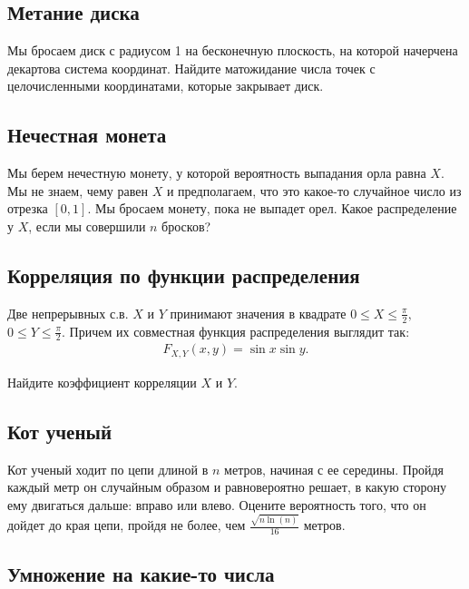 \documentclass[12pt]{article}
\begin{document}
\subsection{Метание диска}

Мы бросаем диск с радиусом 1 на бесконечную плоскость, на которой начерчена декартова система координат. Найдите матожидание числа точек с целочисленными координатами, которые закрывает диск.



\subsection{Нечестная монета}

Мы берем нечестную монету, у которой вероятность выпадания орла равна $X$. Мы не знаем, чему равен $X$ и предполагаем, что это какое-то случайное число из отрезка $[0, 1]$. Мы бросаем монету, пока не выпадет орел. Какое распределение у $X$, если мы совершили $n$ бросков?



\subsection{Корреляция по функции распределения}

Две непрерывных с.в. $X$ и $Y$ принимают значения в квадрате $0 \le X \le \frac{\pi}{2},$ $0 \le Y \le \frac{\pi}{2}$. Причем их совместная функция распределения выглядит так:
\begin{align*}
    F_{X, Y} (x, y) = \sin x \sin y.
\end{align*}

Найдите коэффициент корреляции $X$ и $Y$.



\subsection{Кот ученый}

Кот ученый ходит по цепи длиной в $n$ метров, начиная с ее середины. Пройдя каждый метр он случайным образом и равновероятно решает, в какую сторону ему двигаться дальше: вправо или влево. Оцените вероятность того, что он дойдет до края цепи, пройдя не более, чем $\frac{\sqrt{n \ln(n)}}{16}$ метров.



\subsection{Умножение на какие-то числа}
\end{document}
